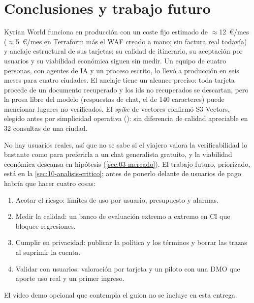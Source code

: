 \section{Conclusiones y trabajo futuro}\label{sec:11-conclusiones}

Kyrian World funciona en producción con un coste fijo estimado de $\approx$12~€/mes
($\approx$5~€/mes en Terraform más el WAF creado a mano; sin factura real todavía) y anclaje
estructural de sus tarjetas; su calidad de itinerario, su aceptación por usuarios y su viabilidad
económica siguen sin medir. Un equipo de cuatro personas, con agentes de IA y un proceso escrito, lo
llevó a producción en seis meses para cuatro ciudades. El anclaje tiene un alcance preciso: toda
tarjeta procede de un documento recuperado y los ids no recuperados se descartan, pero la prosa
libre del modelo (respuestas de chat, el  de 140 caracteres) puede mencionar lugares no
verificados. El \emph{spike} de vectores confirmó S3 Vectors, elegido antes por simplicidad
operativa (): sin diferencia de calidad apreciable en 32 consultas de una ciudad.

No hay usuarios reales, así que no se sabe si el viajero valora la verificabilidad lo bastante
como para preferirla a un chat generalista gratuito, y la viabilidad económica descansa en
hipótesis (\cref{sec:03-mercado}). El trabajo futuro, priorizado, está en la
\cref{sec:10-analisis-critico}; antes de ponerlo delante de usuarios de pago habría que hacer
cuatro cosas:
\begin{enumerate}[nosep]
\item Acotar el riesgo: límites de uso por usuario, presupuesto y alarmas.
\item Medir la calidad: un banco de evaluación extremo a extremo en CI que bloquee regresiones.
\item Cumplir en privacidad: publicar la política y los términos y borrar las trazas al suprimir
  la cuenta.
\item Validar con usuarios: valoración por tarjeta y un piloto con una DMO que aporte uso real y
  un primer ingreso.
\end{enumerate}
El vídeo demo opcional que contempla el guion no se incluye en esta entrega.
